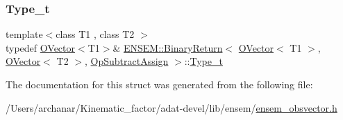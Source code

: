 \mbox{\label{structENSEM_1_1BinaryReturn_3_01OVector_3_01T1_01_4_00_01OVector_3_01T2_01_4_00_01OpSubtractAssign_01_4_a5458d7236f7c48041a285b31ba719321}} 
\subsubsection{\texorpdfstring{Type\_t}{Type\_t}\hspace{0.1cm}{\footnotesize\ttfamily [3/3]}}
{\footnotesize\ttfamily template$<$class T1 , class T2 $>$ \\
typedef \mbox{\hyperlink{classENSEM_1_1OVector}{O\+Vector}}$<$T1$>$\& \mbox{\hyperlink{structENSEM_1_1BinaryReturn}{E\+N\+S\+E\+M\+::\+Binary\+Return}}$<$ \mbox{\hyperlink{classENSEM_1_1OVector}{O\+Vector}}$<$ T1 $>$, \mbox{\hyperlink{classENSEM_1_1OVector}{O\+Vector}}$<$ T2 $>$, \mbox{\hyperlink{structENSEM_1_1OpSubtractAssign}{Op\+Subtract\+Assign}} $>$\+::\mbox{\hyperlink{structENSEM_1_1BinaryReturn_3_01OVector_3_01T1_01_4_00_01OVector_3_01T2_01_4_00_01OpSubtractAssign_01_4_a5458d7236f7c48041a285b31ba719321}{Type\+\_\+t}}}



The documentation for this struct was generated from the following file\+:\begin{DoxyCompactItemize}
\item 
/\+Users/archanar/\+Kinematic\+\_\+factor/adat-\/devel/lib/ensem/\mbox{\hyperlink{adat-devel_2lib_2ensem_2ensem__obsvector_8h}{ensem\+\_\+obsvector.\+h}}\end{DoxyCompactItemize}
